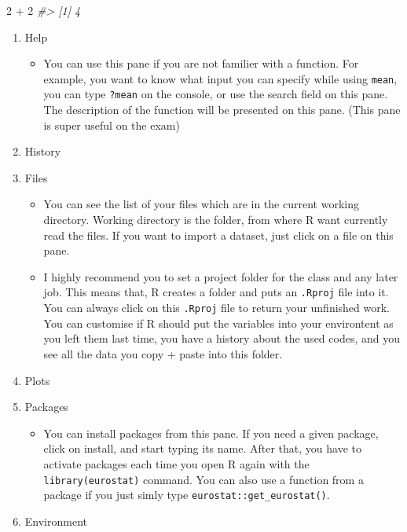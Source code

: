\documentclass[
]{article}
\newenvironment{Shaded}{\begin{snugshade}}{\end{snugshade}}
\newcommand{\CommentTok}[1]{\textcolor[rgb]{0.56,0.35,0.01}{\textit{#1}}}
\newcommand{\DecValTok}[1]{\textcolor[rgb]{0.00,0.00,0.81}{#1}}
\newcommand{\SpecialCharTok}[1]{\textcolor[rgb]{0.00,0.00,0.00}{#1}}
\providecommand{\tightlist}{%
  \setlength{\itemsep}{0pt}\setlength{\parskip}{0pt}}
\begin{document}
\begin{Shaded}
\begin{Highlighting}[]
\DecValTok{2} \SpecialCharTok{+} \DecValTok{2}
\CommentTok{\#\textgreater{} [1] 4}
\end{Highlighting}
\end{Shaded}

\begin{enumerate}
\def\labelenumi{\arabic{enumi}.}
\setcounter{enumi}{2}
\item
  Help

  \begin{itemize}
  \tightlist
  \item
    You can use this pane if you are not familier with a function. For example, you want to know what input you can specify while using \texttt{mean}, you can type \texttt{?mean} on the console, or use the search field on this pane. The description of the function will be presented on this pane. (This pane is super useful on the exam)
  \end{itemize}
\item
  History
\item
  Files

  \begin{itemize}
  \tightlist
  \item
    You can see the list of your files which are in the current working directory. Working directory is the folder, from where R want currently read the files. If you want to import a dataset, just click on a file on this pane.
  \item
    I highly recommend you to set a project folder for the class and any later job. This means that, R creates a folder and puts an \texttt{.Rproj} file into it. You can always click on this \texttt{.Rproj} file to return your unfinished work. You can customise if R should put the variables into your environtent as you left them last time, you have a history about the used codes, and you see all the data you copy + paste into this folder.
  \end{itemize}
\item
  Plots
\item
  Packages

  \begin{itemize}
  \tightlist
  \item
    You can install packages from this pane. If you need a given package, click on install, and start typing its name. After that, you have to activate packages each time you open R again with the \texttt{library(eurostat)} command. You can also use a function from a package if you just simly type \texttt{eurostat::get\_eurostat()}.
  \end{itemize}
\item
  Environment


\end{enumerate}
\end{document}
